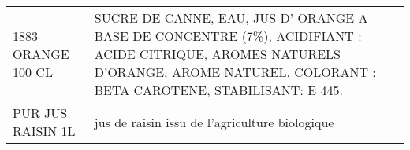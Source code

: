 \begin{longtable}{p{5cm}p{10cm}}
                                                                                       1883 ORANGE 100 CL &                                                                                                                                                                                                                                                                                                                                                                                                                                                                                                                                                                                                                                                                                                                                                                                                                                                         SUCRE DE CANNE, EAU, JUS D' ORANGE A BASE DE CONCENTRE (7\%), ACIDIFIANT : ACIDE CITRIQUE, AROMES NATURELS D'ORANGE, AROME NATUREL, COLORANT : BETA CAROTENE, STABILISANT: E 445. \\
                                                                                        PUR JUS RAISIN 1L &                                                                                                                                                                                                                                                                                                                                                                                                                                                                                                                                                                                                                                                                                                                                                                                                                                                                                                                                                                                           jus de raisin issu de l'agriculture biologique \\

\end{longtable}
